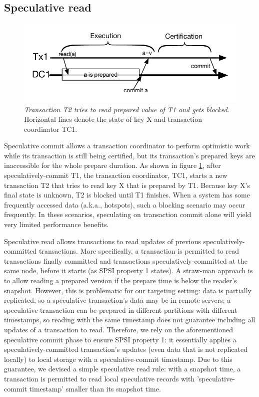 \subsection{Speculative read}
\begin{figure}[tbh]
\centering
\hspace{-6mm}
\centering\includegraphics[scale = 0.48]{figures/NoSpeculativeRead}
\caption{\textit{Transaction T2 tries to read prepared value of T1 and gets blocked.} Horizontal lines denote the state of key X and transaction coordinator TC1.}
\label{fig:specula_read}
\vspace{-3mm}
\end{figure}
Speculative commit allows a transaction coordinator to perform optimistic work while its transaction is still being certified, but its transaction's prepared keys are inaccessible for the whole prepare duration. As shown in figure \ref{fig:specula_read}, after speculatively-commit T1, the transaction coordinator, TC1, starts a new transaction T2 that tries to read key X that is prepared by T1. Because key X's final state is unknown, T2 is blocked until T1 finishes. When a system has some frequently accessed data (a.k.a., hotspots), such a blocking scenario may occur frequently. In these scenarios, speculating on transaction commit alone will yield very limited performance benefits.

Speculative read allows transactions to read updates of previous speculatively-committed transactions. More specifically, a transaction is permitted to read transactions finally committed and transactions speculatively-committed at the same node, before it starts (as SPSI property 1 states). A straw-man approach is to allow reading a prepared version if the prepare time is below the reader's snapshot. However, this is problematic for our targeting setting: data is partially replicated, so a speculative transaction's data may be in remote servers; a speculative transaction can be prepared in different partitions with different timestamps, so reading with the same timestamp does not guarantee including all updates of a transaction to read. Therefore, we rely on the aforementioned speculative commit phase to ensure SPSI property 1: it essentially applies a speculatively-committed transaction's updates (even data that is not replicated locally) to local storage with a speculative-commit timestamp. Due to this guarantee, we devised a simple speculative read rule: with a snapshot time, a transaction is permitted to read local speculative records with 'speculative-commit timestamp' smaller than its snapshot time.

